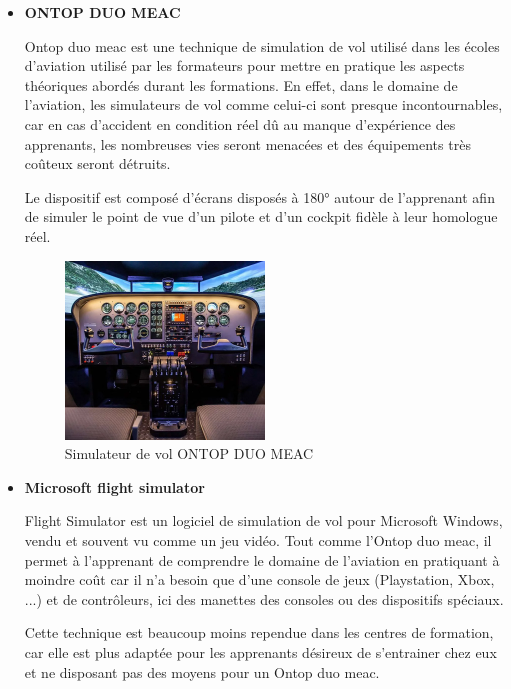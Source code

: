 \begin{itemize}
	\item \textbf{ONTOP DUO MEAC}

	      Ontop duo meac est une technique de simulation de vol utilisé dans les écoles d’aviation utilisé par les formateurs pour mettre en pratique les aspects théoriques abordés durant les formations. 
		  En effet, dans le domaine de l’aviation, les simulateurs de vol comme celui-ci sont presque incontournables, car en cas d’accident en condition réel dû au manque d’expérience des apprenants, les nombreuses vies seront menacées et des équipements très coûteux seront détruits.

	      Le dispositif est composé d'écrans disposés à 180° autour de l’apprenant afin de simuler le point de vue d’un pilote et d’un cockpit fidèle à leur homologue réel.

	      \begin{figure}[H]
		      \centering
		      \includegraphics[width=0.5\textwidth]{img/svol1}
		      \caption{Simulateur de vol ONTOP DUO MEAC}
		      \label{fig:mesh1}
	      \end{figure}

	\item \textbf{Microsoft flight simulator}

	      Flight Simulator est un logiciel de simulation de vol pour Microsoft Windows, vendu et souvent vu comme un jeu vidéo. Tout comme l'Ontop duo meac, il permet à l'apprenant de comprendre le domaine de l’aviation en pratiquant à moindre coût car il n’a besoin que d’une console de jeux (Playstation, Xbox, ...) et de contrôleurs, ici des manettes des consoles ou des dispositifs spéciaux.

	      Cette technique est beaucoup moins rependue dans les centres de formation, car elle est plus adaptée pour les apprenants désireux de s’entrainer chez eux et ne disposant pas des moyens pour un Ontop duo meac.


\end{itemize}
